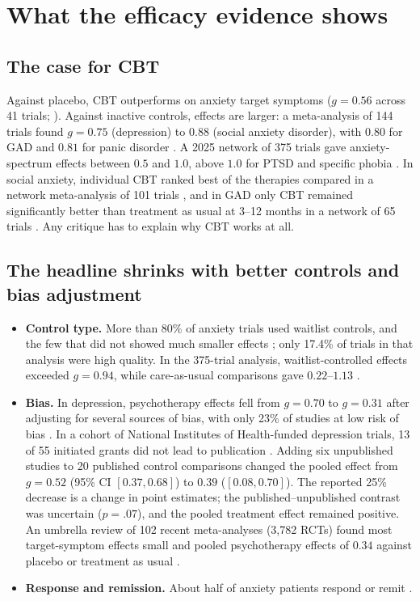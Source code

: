 \section{What the efficacy evidence shows}\label{sec:evidence}
\subsection{The case for CBT}
Against placebo, CBT outperforms on anxiety target symptoms ($g=0.56$ across 41 trials; \citealt{carpenter2018cbt}).
Against inactive controls, effects are larger: a meta-analysis of 144 trials found $g=0.75$ (depression) to $0.88$ (social anxiety disorder), with $0.80$ for GAD and $0.81$ for panic disorder \citep{cuijpers2016update}.
A 2025 network of 375 trials gave anxiety-spectrum effects between $0.5$ and $1.0$, above $1.0$ for PTSD and specific phobia \citep{cuijpers2025unified}.
In social anxiety, individual CBT ranked best of the therapies compared in a network meta-analysis of 101 trials \citep{mayowilson2014sad}, and in GAD only CBT remained significantly better than treatment as usual at 3--12 months in a network of 65 trials \citep{papola2024gad}.
Any critique has to explain why CBT works at all.

\subsection{The headline shrinks with better controls and bias adjustment}
\begin{itemize}
\item \textbf{Control type.} More than 80\% of anxiety trials used waitlist controls, and the few that did not showed much smaller effects \citep{cuijpers2016update}; only 17.4\% of trials in that analysis were high quality.
In the 375-trial analysis, waitlist-controlled effects exceeded $g=0.94$, while care-as-usual comparisons gave $0.22$--$1.13$ \citep{cuijpers2025unified}.
\item \textbf{Bias.} In depression, psychotherapy effects fell from $g=0.70$ to $g=0.31$ after adjusting for several sources of bias, with only 23\% of studies at low risk of bias \citep{cuijpers2019eysenck}.
In a cohort of National Institutes of Health-funded depression trials, 13 of 55 initiated grants did not lead to publication \citep{driessen2015publicationbias}.
Adding six unpublished studies to 20 published control comparisons changed the pooled effect from $g=0.52$ (95\% CI $[0.37,0.68]$) to $0.39$ ($[0.08,0.70]$).
The reported 25\% decrease is a change in point estimates; the published--unpublished contrast was uncertain ($p=.07$), and the pooled treatment effect remained positive.
An umbrella review of 102 recent meta-analyses (3{,}782 RCTs) found most target-symptom effects small and pooled psychotherapy effects of $0.34$ against placebo or treatment as usual \citep{leichsenring2022umbrella}.
\item \textbf{Response and remission.} About half of anxiety patients respond or remit \citep{loerinc2015response,springer2018remission}.
\end{itemize}

